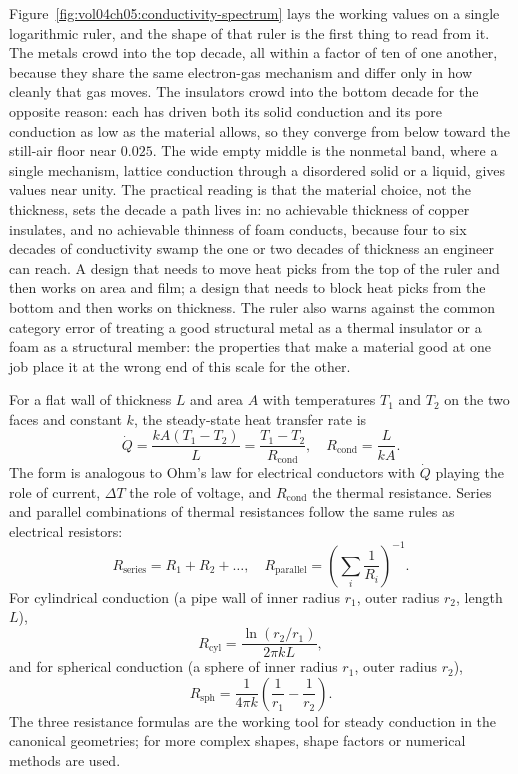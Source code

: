 

Figure~\ref{fig:vol04ch05:conductivity-spectrum} lays the working values on
a single logarithmic ruler, and the shape of that ruler is the first thing
to read from it. The metals crowd into the top decade, all within a factor
of ten of one another, because they share the same electron-gas mechanism
and differ only in how cleanly that gas moves. The insulators crowd into
the bottom decade for the opposite reason: each has driven both its solid
conduction and its pore conduction as low as the material allows, so they
converge from below toward the still-air floor near $0.025$. The wide
empty middle is the nonmetal band, where a single mechanism, lattice
conduction through a disordered solid or a liquid, gives values near unity.
The practical reading is that the material choice, not the thickness, sets
the decade a path lives in: no achievable thickness of copper insulates,
and no achievable thinness of foam conducts, because four to six decades of
conductivity swamp the one or two decades of thickness an engineer can
reach. A design that needs to move heat picks from the top of the ruler and
then works on area and film; a design that needs to block heat picks from
the bottom and then works on thickness. The ruler also warns against the
common category error of treating a good structural metal as a thermal
insulator or a foam as a structural member: the properties that make a
material good at one job place it at the wrong end of this scale for the
other.

For a flat wall of thickness $L$ and area $A$ with temperatures $T_1$
and $T_2$ on the two faces and constant $k$, the steady-state heat
transfer rate is
\[
\dot{Q} = \frac{k A (T_1 - T_2)}{L} = \frac{T_1 - T_2}{R_{\text{cond}}},
\quad R_{\text{cond}} = \frac{L}{k A}.
\]
The form is analogous to Ohm's law for electrical conductors with
$\dot{Q}$ playing the role of current, $\Delta T$ the role of
voltage, and $R_{\text{cond}}$ the thermal resistance. Series and
parallel combinations of thermal resistances follow the same rules
as electrical resistors:
\[
R_{\text{series}} = R_1 + R_2 + \ldots, \quad R_{\text{parallel}} =
\left(\sum_i \frac{1}{R_i}\right)^{-1}.
\]
For cylindrical conduction (a pipe wall of inner radius $r_1$, outer
radius $r_2$, length $L$),
\[
R_{\text{cyl}} = \frac{\ln(r_2/r_1)}{2\pi k L},
\]
and for spherical conduction (a sphere of inner radius $r_1$, outer
radius $r_2$),
\[
R_{\text{sph}} = \frac{1}{4\pi k}\left(\frac{1}{r_1} - \frac{1}{r_2}
\right).
\]
The three resistance formulas are the working tool for steady
conduction in the canonical geometries; for more complex shapes,
shape factors or numerical methods are used.

